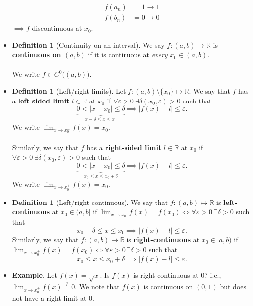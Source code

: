 \documentclass{article}
\newcommand{\R}{\mathbb{R}}
\newcommand{\?}{\stackrel{?}{=}}
\theoremstyle{definition} %
\newtheorem{definition}[subsection]{Definition} %
\begin{document}
\begin{itemize}
    \begin{align*}
        f(a_n) &= 1 \rightarrow 1 \\
        f(b_n) &= 0 \rightarrow 0
    \end{align*}
    $\implies f$ discontinuous at $x_0$.
    \item[]
    \begin{definition}[Continuity on an interval]
        We say $f: (a, b) \mapsto \R$ is \textbf{continuous on $(a, b)$} if it is continuous at \textit{every} $x_0 \in (a, b)$. \\\\
        We write $f \in C^0 \big((a, b)\big)$.
    \end{definition}
    \item[]
    \begin{definition}[Left/right limits]
        Let $f: (a, b) \setminus \{x_0\} \mapsto \R$. We say that $f$ has a \textbf{left-sided limit} $l \in \R$ at $x_0$ if $\forall \varepsilon > 0 \ \exists \delta(x_0, \varepsilon) > 0$ such that
        $$\underbrace{0 < |x - x_0| \leq \delta}_{x - \delta \leq x \leq x_0} \implies |f(x) - l| \leq \varepsilon.$$ 
        We write $\lim_{x \to x_0^-} f(x) = x_0$. \\\\
        Similarly, we say that $f$ has a \textbf{right-sided limit} $l \in \R$ at $x_0$ if $\forall \varepsilon > 0 \ \exists \delta(x_0, \varepsilon) > 0$ such that
        $$\underbrace{0 < |x - x_0| \leq \delta}_{x_0 \leq x \leq x_0 + \delta} \implies |f(x) - l| \leq \varepsilon.$$
        We write $\lim_{x \to x_0^+} f(x) = x_0$.
    \end{definition}
    \item[]
    \begin{definition}[Left/right continuous]
        We say that $f: (a, b) \mapsto \R$ is \textbf{left-continuous} at $x_0 \in (a, b]$ if $\lim_{x \to x_0^-} f(x) = f(x_0) \iff \forall \varepsilon > 0 \ \exists \delta > 0$ such that
        $$x_0 - \delta \leq x \leq x_0 \implies |f(x) - l| \leq \varepsilon.$$
        Similarly, we say that $f: (a, b) \mapsto \R$ is \textbf{right-continuous} at $x_0 \in [a, b)$ if $\lim_{x \to x_0^+} f(x) = f(x_0) \iff \forall \varepsilon > 0 \ \exists \delta > 0$ such that
        $$x_0 \leq x \leq x_0 + \delta \implies |f(x) - l| \leq \varepsilon.$$
    \end{definition}
    \item \textbf{Example}. Let $f(x) = \sqrt{x}$. Is $f(x)$ is right-continuous at 0? i.e., $\lim_{x \to x_0^+} f(x) \overset{?}{=} 0$. We note that $f(x)$ is continuous on $(0, 1)$ but does not have a right limit at 0.

\end{itemize}
\end{document}

